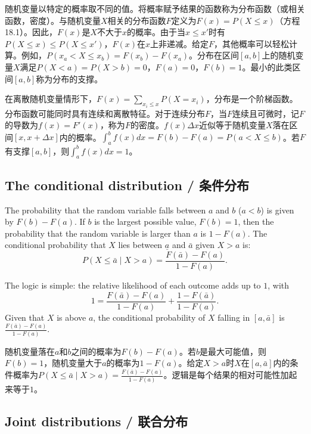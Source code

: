 \begin{translation}
随机变量以特定的概率取不同的值。将概率赋予结果的函数称为分布函数（或相关函数，密度）。与随机变量$X$相关的分布函数$F$定义为$F(x) = P(X \leq x)$（方程18.1）。因此，$F(x)$是$X$不大于$x$的概率。由于当$x \leq x'$时有$P(X \leq x) \leq P(X \leq x')$，$F(x)$在$x$上非递减。给定$F$，其他概率可以轻松计算。例如，$P(x_a < X \leq x_b) = F(x_b) - F(x_a)$。分布在区间$[a, b]$上的随机变量$X$满足$P(X < a) = P(X > b) = 0$，$F(a) = 0$，$F(b) = 1$。最小的此类区间$[a, b]$称为分布的支撑。

在离散随机变量情形下，$F(x) = \sum_{x_i \leq x} P(X = x_i)$，分布是一个阶梯函数。分布函数可能同时具有连续和离散特征。对于连续分布$F$，当$F$连续且可微时，记$F$的导数为$f(x) = F'(x)$，称为$F$的密度。$f(x)\Delta x$近似等于随机变量$X$落在区间$[x, x + \Delta x]$内的概率。$\int_a^b f(x)dx = F(b) - F(a) = P(a < X \leq b)$。若$F$有支撑$[a, b]$，则$\int_a^b f(x)dx = 1$。
\end{translation}

\subsection{The conditional distribution / 条件分布}

\begin{original}
The probability that the random variable falls between $a$ and $b$ ($a < b$) is given by $F(b) - F(a)$. If $b$ is the largest possible value, $F(b) = 1$, then the probability that the random variable is larger than $a$ is $1 - F(a)$. The conditional probability that $X$ lies between $\underline{a}$ and $\bar{a}$ given $X > a$ is:
\[
P(X \leq \bar{a} \mid X > a) = \frac{F(\bar{a}) - F(a)}{1 - F(a)}.
\]

The logic is simple: the relative likelihood of each outcome adds up to $1$, with
\[
1 = \frac{F(\bar{a}) - F(a)}{1 - F(a)} + \frac{1 - F(\bar{a})}{1 - F(a)}.
\]
Given that $X$ is above $a$, the conditional probability of $X$ falling in $[a, \bar{a}]$ is $\frac{F(\bar{a})-F(a)}{1-F(a)}$.
\end{original}
\begin{translation}
随机变量落在$a$和$b$之间的概率为$F(b) - F(a)$。若$b$是最大可能值，则$F(b) = 1$，随机变量大于$a$的概率为$1 - F(a)$。给定$X > a$时$X$在$[a, \bar{a}]$内的条件概率为$P(X \leq \bar{a} \mid X > a) = \frac{F(\bar{a}) - F(a)}{1 - F(a)}$。逻辑是每个结果的相对可能性加起来等于$1$。
\end{translation}

\subsection{Joint distributions / 联合分布}

